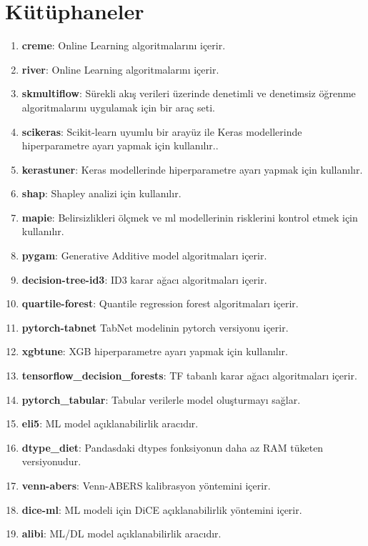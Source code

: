 \section{Kütüphaneler}
\begin{enumerate}
    \item \textbf{creme}: Online Learning algoritmalarını içerir.
    \item \textbf{river}: Online Learning algoritmalarını içerir.
    \item \textbf{skmultiflow}: Sürekli akış verileri üzerinde denetimli ve denetimsiz öğrenme algoritmalarını uygulamak için bir araç seti.
    \item \textbf{scikeras}: Scikit-learn uyumlu bir arayüz ile Keras modellerinde hiperparametre ayarı yapmak için kullanılır..
    \item \textbf{kerastuner}: Keras modellerinde hiperparametre ayarı yapmak için kullanılır.
    \item \textbf{shap}: Shapley analizi için kullanılır.
    \item \textbf{mapie}: Belirsizlikleri ölçmek ve ml modellerinin risklerini kontrol etmek için kullanılır.
    \item \textbf{pygam}: Generative Additive model algoritmaları içerir.
    \item \textbf{decision-tree-id3}: ID3 karar ağacı algoritmaları içerir.
    \item \textbf{quartile-forest}: Quantile regression forest algoritmaları içerir.
    \item \textbf{pytorch-tabnet} TabNet modelinin pytorch versiyonu içerir.
    \item \textbf{xgbtune}: XGB hiperparametre ayarı yapmak için kullanılır.
    \item \textbf{tensorflow\_decision\_forests}: TF tabanlı karar ağacı algoritmaları içerir.
    \item \textbf{pytorch\_tabular}: Tabular verilerle model oluşturmayı sağlar.
    \item \textbf{eli5}: ML model açıklanabilirlik aracıdır.
    \item \textbf{dtype\_diet}: Pandasdaki dtypes fonksiyonun daha az RAM tüketen versiyonudur.
    \item \textbf{venn-abers}: Venn-ABERS kalibrasyon yöntemini içerir.
    \item \textbf{dice-ml}: ML modeli için DiCE açıklanabilirlik yöntemini içerir.
    \item \textbf{alibi}: ML/DL model açıklanabilirlik aracıdır.

\end{enumerate}
